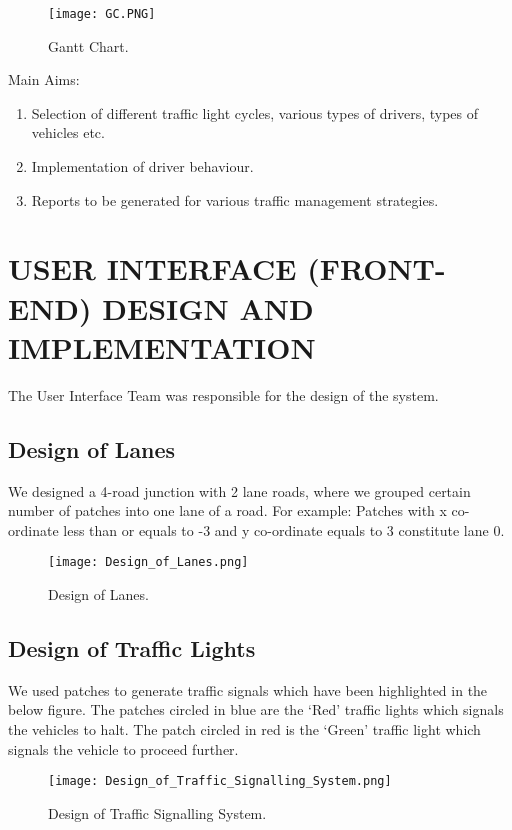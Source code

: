 \documentclass[11pt,a4paper]{article}
\begin{document}
\begin{figure}[!ht]
\centering
\texttt{[image: GC.PNG]}
\caption{\label{fig:gc}Gantt Chart.}
\end{figure}

Main Aims:

\begin{enumerate}
\item Selection of different traffic light cycles, various types of drivers, types of vehicles etc.
\item Implementation of driver behaviour.
\item Reports to be generated for various traffic management strategies.
\end{enumerate}


\section{USER INTERFACE (FRONT-END) DESIGN AND IMPLEMENTATION}

The User Interface Team was responsible for the design of the system.

\subsection{\textbf{Design of Lanes}}

We designed a 4-road junction with 2 lane roads, where we grouped certain number of patches into one lane of a road. For example: Patches with x co-ordinate less than or equals to -3 and y co-ordinate equals to 3 constitute lane 0.

\begin{figure}[!ht]
\centering
\texttt{[image: Design\_of\_Lanes.png]}
\caption{\label{fig:dol}Design of Lanes.}
\end{figure}
                                    
\subsection{\textbf{Design of Traffic Lights}}

We used patches to generate traffic signals which have been highlighted in the below figure. The patches circled in blue are the ‘Red’ traffic lights which signals the vehicles to halt. The patch circled in red is the ‘Green’ traffic light which signals the vehicle to proceed further.

\newpage
\begin{figure}[!ht]
\centering
\texttt{[image: Design\_of\_Traffic\_Signalling\_System.png]}
\caption{\label{fig:dotss}Design of Traffic Signalling System.}
\end{figure}
                                    
\end{document}
